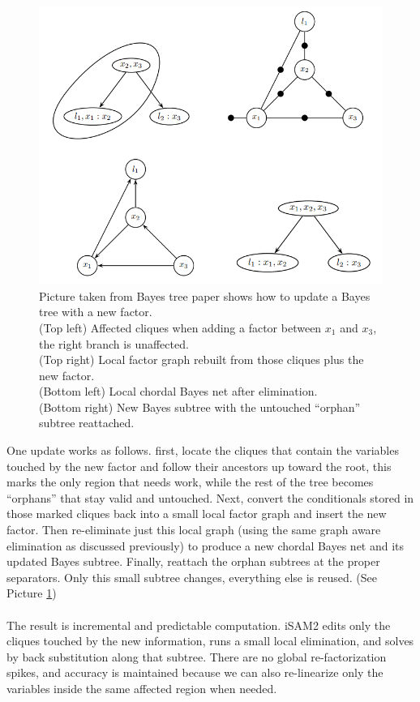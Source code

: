 \begin{figure}[H]
    \centering
    \includegraphics[width=0.98\linewidth]{Pictures/Optimizers/iSAM2/updating_Bayes_tree.png}
    \caption{Picture taken from Bayes tree paper \cite{Bayes_tree_for_SLAM_paper} shows how to update a Bayes tree with a new factor. \\ \noindent 
    (Top left) Affected cliques when adding a factor between $x_1$ and $x_3$, the right branch is unaffected. \\ \noindent
    (Top right) Local factor graph rebuilt from those cliques plus the new factor. \\ \noindent
    (Bottom left) Local chordal Bayes net after elimination. \\ \noindent
    (Bottom right) New Bayes subtree with the untouched ``orphan'' subtree reattached.}
    \label{fig:optimizer-iSAM2-R-update-tree}
\end{figure}
\noindent
One update works as follows. first, locate the cliques that contain the variables touched by the new factor and follow their ancestors up toward the root, this marks the only region that needs work, while the rest of the tree becomes ``orphans'' that stay valid and untouched. Next, convert the conditionals stored in those marked cliques back into a small local factor graph and insert the new factor. Then re-eliminate just this local graph (using the same graph aware elimination as discussed previously) to produce a new chordal Bayes net and its updated Bayes subtree. Finally, reattach the orphan subtrees at the proper separators. Only this small subtree changes, everything else is reused. (See Picture \ref{fig:optimizer-iSAM2-R-update-tree})
\\ \\
The result is incremental and predictable computation. iSAM2 edits only the cliques touched by the new information, runs a small local elimination, and solves by back substitution along that subtree. There are no global re-factorization spikes, and accuracy is maintained because we can also re-linearize only the variables inside the same affected region when needed.



